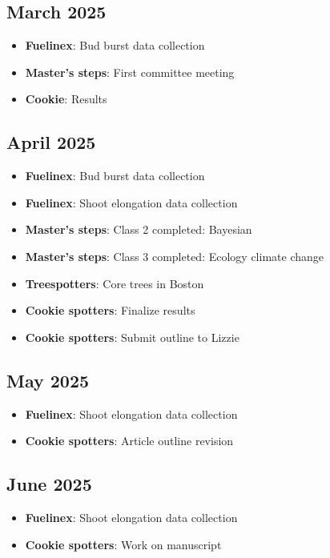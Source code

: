 \documentclass{article}
\begin{document}
\subsection*{March 2025}
\begin{itemize}
    \item \textbf{Fuelinex}: Bud burst data collection
    \item \textbf{Master's steps}: First committee meeting
    \item \textbf{Cookie}: Results
\end{itemize}

\subsection*{April 2025}
\begin{itemize}
    \item \textbf{Fuelinex}: Bud burst data collection
    \item \textbf{Fuelinex}: Shoot elongation data collection
    \item \textbf{Master's steps}: Class 2 completed: Bayesian
    \item \textbf{Master's steps}: Class 3 completed: Ecology climate change
    \item \textbf{Treespotters}: Core trees in Boston
    \item \textbf{Cookie spotters}: Finalize results
    \item \textbf{Cookie spotters}: Submit outline to Lizzie
\end{itemize}

\subsection*{May 2025}
\begin{itemize}
    \item \textbf{Fuelinex}: Shoot elongation data collection
    \item \textbf{Cookie spotters}: Article outline revision
\end{itemize}

\subsection*{June 2025}
\begin{itemize}
    \item \textbf{Fuelinex}: Shoot elongation data collection
    \item \textbf{Cookie spotters}: Work on manuscript
\end{itemize}
\end{document}
